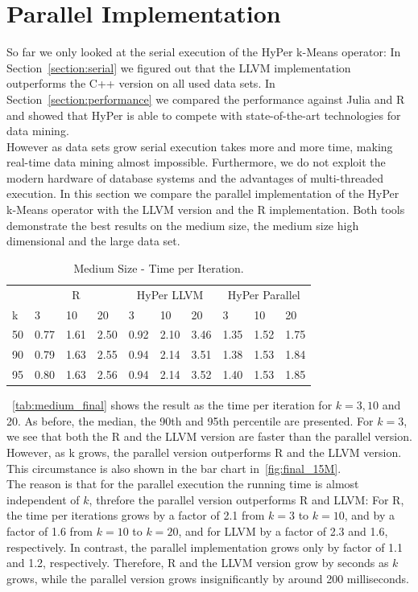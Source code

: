 \section{Parallel Implementation}


So far we only looked at the serial execution of the HyPer k-Means operator: In Section~\ref{section:serial}  we figured out that the LLVM implementation outperforms the C++ version on all used data sets. In Section~\ref{section:performance} we compared the performance against Julia and R and showed that HyPer is able to compete with state-of-the-art technologies for data mining.
\\
However as data sets grow serial execution takes more and more time, making real-time data mining almost impossible. Furthermore, we do not exploit the modern hardware of database systems and the advantages of multi-threaded execution. In this section we compare the parallel implementation of the HyPer k-Means operator with the LLVM version and the R implementation. Both tools demonstrate the best results on the medium size, the medium size high dimensional and the large data set. 

\begin{table}[htsb]
  \caption[Medium Size - Time per Iteration]{Medium Size - Time per Iteration.}
  \label{tab:medium_final}
  \centering
  \begin{tabular}{l l l l l l l l l l }
    \toprule
      & \multicolumn{3}{c}{R} & \multicolumn{3}{c}{HyPer LLVM} & \multicolumn{3}{c}{HyPer Parallel}  \\
      k & 3 & 10 & 20 & 3 & 10 & 20 & 3 & 10 & 20 \\
    \midrule
      50  & 0.77 & 1.61 & 2.50 & 0.92 & 2.10 & 3.46 & 1.35 & 1.52 & 1.75 \\
      90  & 0.79 & 1.63 & 2.55 & 0.94 & 2.14 & 3.51 & 1.38 & 1.53 & 1.84 \\
      95  & 0.80 & 1.63 & 2.56 & 0.94 & 2.14 & 3.52 & 1.40 & 1.53 & 1.85 \\
    \bottomrule
  \end{tabular}
\end{table}

~\autoref{tab:medium_final} shows the result as the time per iteration for $k = 3, 10$ and 20. As before, the median, the 90th and 95th percentile are presented. For $k = 3$, we see that both the R and the LLVM version are faster than the parallel version. However, as k grows, the parallel version outperforms R and the LLVM version. This circumstance is also shown in the bar chart in~\autoref{fig:final_15M}.
\\
The reason is that for the parallel execution the running time is almost independent of $k$, threfore the parallel version outperforms R and LLVM: For R, the time per iterations grows by a factor of 2.1 from $k = 3$ to $k = 10$, and by a factor of 1.6 from $k = 10$ to $k = 20$, and for LLVM by a factor of 2.3 and 1.6, respectively. In contrast, the parallel implementation grows only by factor of 1.1 and 1.2, respectively. Therefore, R and the LLVM version grow by seconds as $k$ grows, while the parallel version grows insignificantly by around 200 milliseconds. 

